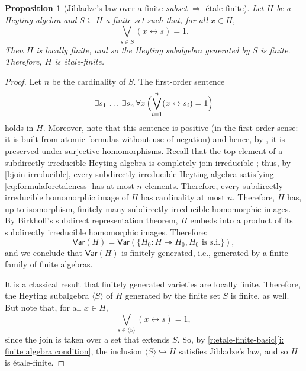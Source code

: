 \documentclass[12pt]{amsart}
\theoremstyle{plain}
\newtheorem{proposition}[theorem]{Proposition}
\theoremstyle{definition}
\begin{document}
\begin{proposition}[Jibladze's law over a finite \emph{subset} $\Rightarrow$ étale-finite]\label{prop: finite set to etale-finite}
    Let $H$ be a Heyting algebra and $S\subseteq H$ a finite set such that, for all $x \in H$,
    \[
        \bigvee_{s\in S}(x \leftrightarrow s) =1.
    \]
    Then $H$ is locally finite, and so the Heyting subalgebra generated by $S$ is finite.
    Therefore, $H$ is étale-finite.
\end{proposition}
\begin{proof}
    Let $n$ be the cardinality of $S$.
    The first-order sentence
    \begin{equation}\label{eq:formulaforetaleness}
        \exists s_{1}\,\dots\,\exists s_{n}\,\forall x\,\Bigl(\bigvee_{i=1}^{n}(x \leftrightarrow s_{i})=1\Bigr)
    \end{equation}
    holds in $H$.
    Moreover, note that this sentence is positive (in the first-order sense: it is built from atomic formulas without use of negation) and hence, by \cite[Prop.~5.2.12]{Chang2012-ub}, it is preserved under surjective homomorphisms. Recall that the top element of a subdirectly irreducible Heyting algebra is completely join-irreducible \cite[Prop.~A.1.1]{Esakiach2019HeyAlg}; thus, by \cref{l:join-irreducible}, every subdirectly irreducible Heyting algebra satisfying \eqref{eq:formulaforetaleness} has at most $n$ elements. Therefore, every subdirectly irreducible homomorphic image of $H$ has cardinality at most $n$.
    Therefore, $H$ has, up to isomorphism, finitely many subdirectly irreducible homomorphic images. 
    By Birkhoff's subdirect representation theorem, $H$ embeds into a product of its subdirectly irreducible homomorphic images. Therefore:
    \begin{equation*}
        \mathsf{Var}(H)=\mathsf{Var}(\{H_{0} : H\twoheadrightarrow H_{0}, H_{0}\text{ is s.i.}\}),
    \end{equation*}
    and we conclude that $\mathsf{Var}(H)$ is finitely generated, i.e., generated by a finite family of finite algebras.

    It is a classical result \cite[Theorem~10.16]{BurrisSankappanavar} that finitely generated varieties are locally finite.
    Therefore, the Heyting subalgebra $\langle S\rangle$ of $H$ generated by the finite set $S$ is finite, as well. But note that, for all $x \in H$,
    \begin{equation*}
        \bigvee_{s\in \langle S\rangle}(x\leftrightarrow s)=1,
    \end{equation*}
    since the join is taken over a set that extends $S$. So, by \cref{r:etale-finite-basic}\eqref{i: finite algebra condition}, the inclusion $\langle S\rangle \hookrightarrow H$ satisfies Jibladze's law, and so $H$ is étale-finite.
\end{proof}
\end{document}
